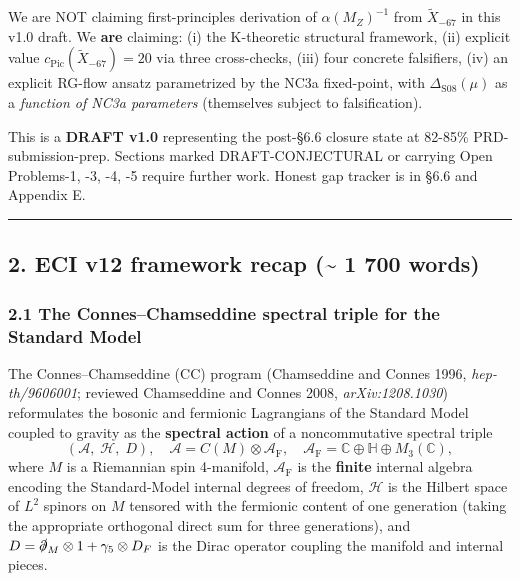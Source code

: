 \documentclass[
  11pt,
  a4paper,
]{article}
\begin{document}
We are NOT claiming first-principles derivation of \(\alpha(M_Z)^{-1}\) from \(\tilde X_{-67}\) in this v1.0 draft. We \textbf{are} claiming: (i) the K-theoretic structural framework, (ii) explicit value \(c_{\mathrm{Pic}}(\tilde X_{-67}) = 20\) via three cross-checks, (iii) four concrete falsifiers, (iv) an explicit RG-flow ansatz parametrized by the NC3a fixed-point, with \(\Delta_{\mathrm{S08}}(\mu)\) as a \emph{function of NC3a parameters} (themselves subject to falsification).

This is a \textbf{DRAFT v1.0} representing the post-§6.6 closure state at 82-85\% PRD-submission-prep. Sections marked DRAFT-CONJECTURAL or carrying Open Problems-1, -3, -4, -5 require further work. Honest gap tracker is in §6.6 and Appendix E.

\begin{center}\rule{0.5\linewidth}{0.5pt}\end{center}

\hypertarget{eci-v12-framework-recap-1-700-words}{%
\subsection{2. ECI v12 framework recap (\textasciitilde{} 1 700 words)}\label{eci-v12-framework-recap-1-700-words}}

\hypertarget{the-conneschamseddine-spectral-triple-for-the-standard-model}{%
\subsubsection{2.1 The Connes--Chamseddine spectral triple for the Standard Model}\label{the-conneschamseddine-spectral-triple-for-the-standard-model}}

The Connes--Chamseddine (CC) program (Chamseddine and Connes 1996, \emph{hep-th/9606001}; reviewed Chamseddine and Connes 2008, \emph{arXiv:1208.1030}) reformulates the bosonic and fermionic Lagrangians of the Standard Model coupled to gravity as the \textbf{spectral action} of a noncommutative spectral triple
\[
(\mathcal A,\; \mathcal H,\; D),\quad
\mathcal A = C(M) \otimes \mathcal A_{\mathrm{F}},\quad
\mathcal A_{\mathrm{F}} = \mathbb C \oplus \mathbb H \oplus M_3(\mathbb C),
\]
where \(M\) is a Riemannian spin 4-manifold, \(\mathcal A_{\mathrm{F}}\) is the \textbf{finite} internal algebra encoding the Standard-Model internal degrees of freedom, \(\mathcal H\) is the Hilbert space of \(L^2\) spinors on \(M\) tensored with the fermionic content of one generation (taking the appropriate orthogonal direct sum for three generations), and \(D = \slashed{\partial}_M \otimes 1 + \gamma_5 \otimes D_F\) is the Dirac operator coupling the manifold and internal pieces.
\end{document}
